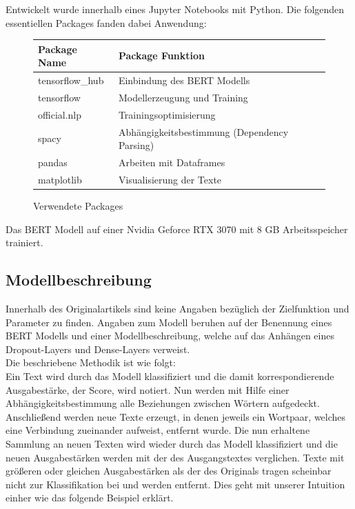 \documentclass[DIV=13,fontsize=11pt]{scrartcl}
\begin{document}
Entwickelt wurde innerhalb eines Jupyter Notebooks mit Python.
Die folgenden essentiellen Packages fanden dabei Anwendung:

\begin{figure}[H]
    \centering
    \begin{tabular}{ll}
        \toprule
        Package Name    & Package Funktion                             \\
        \midrule
        tensorflow\_hub & Einbindung des BERT Modells                  \\
        tensorflow      & Modellerzeugung und Training                 \\
        official.nlp    & Trainingsoptimisierung                       \\
        spacy           & Abhängigkeitsbestimmung (Dependency Parsing) \\
        pandas          & Arbeiten mit Dataframes                      \\
        matplotlib      & Visualisierung der Texte                     \\
        \bottomrule
    \end{tabular}
    \caption{Verwendete Packages}
    \label{fig:packages}
\end{figure}

Das BERT Modell auf einer Nvidia Geforce RTX 3070 mit 8 GB Arbeitsspeicher
trainiert.

\subsection{Modellbeschreibung}

Innerhalb des Originalartikels sind keine Angaben bezüglich der Zielfunktion und
Parameter zu finden. Angaben zum Modell beruhen auf der Benennung eines BERT Modells und
einer Modellbeschreibung, welche auf das Anhängen eines Dropout-Layers und
Dense-Layers verweist.\\

Die beschriebene Methodik ist wie folgt:\\

Ein Text wird durch das Modell klassifiziert und die damit korrespondierende
Ausgabestärke, der Score, wird notiert. Nun werden mit Hilfe einer Abhängigkeitsbestimmung
alle Beziehungen zwischen Wörtern aufgedeckt. Anschließend werden neue Texte
erzeugt, in denen jeweils ein Wortpaar, welches eine Verbindung zueinander
aufweist, entfernt wurde. Die nun erhaltene Sammlung an neuen Texten wird wieder
durch das Modell klassifiziert und die neuen Ausgabestärken werden mit der
des Ausgangstextes verglichen. Texte mit größeren oder gleichen Ausgabestärken
als der des Originals tragen scheinbar nicht zur Klassifikation bei und werden
entfernt. Dies geht mit unserer Intuition einher wie das folgende Beispiel erklärt.\\
\end{document}
